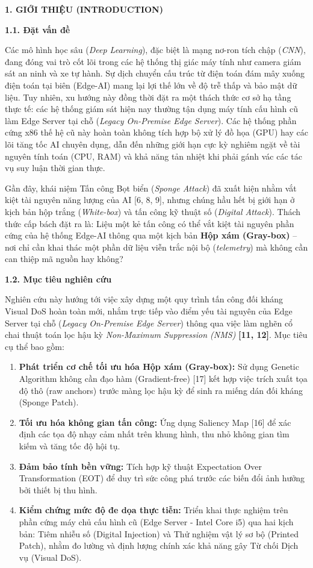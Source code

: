 \textbf{1. GIỚI THIỆU (INTRODUCTION)}

\textbf{1.1. Đặt vấn đề}

Các mô hình học sâu (\emph{Deep Learning}), đặc biệt là mạng nơ-ron tích
chập (\emph{CNN}), đang đóng vai trò cốt lõi trong các hệ thống thị giác
máy tính như camera giám sát an ninh và xe tự hành. Sự dịch chuyển cấu
trúc từ điện toán đám mây xuống điện toán tại biên (Edge-AI) mang lại
lợi thế lớn về độ trễ thấp và bảo mật dữ liệu. Tuy nhiên, xu hướng này
đồng thời đặt ra một thách thức cơ sở hạ tầng thực tế: các hệ thống giám
sát hiện nay thường tận dụng máy tính cấu hình cũ làm Edge Server tại
chỗ (\emph{Legacy On-Premise Edge Server}). Các hệ thống phần cứng x86
thế hệ cũ này hoàn toàn không tích hợp bộ xử lý đồ họa (GPU) hay các lõi
tăng tốc AI chuyên dụng, dẫn đến những giới hạn cực kỳ nghiêm ngặt về
tài nguyên tính toán (CPU, RAM) và khả năng tản nhiệt khi phải gánh vác
các tác vụ suy luận thời gian thực.

Gần đây, khái niệm Tấn công Bọt biển (\emph{Sponge Attack}) đã xuất hiện
nhằm vắt kiệt tài nguyên năng lượng của AI {[}6, 8, 9{]}, nhưng chúng
hầu hết bị giới hạn ở kịch bản hộp trắng (\emph{White-box}) và tấn công
kỹ thuật số (\emph{Digital Attack}). Thách thức cấp bách đặt ra là: Liệu
một kẻ tấn công có thể vắt kiệt tài nguyên phần cứng của hệ thống
Edge-AI thông qua một kịch bản \textbf{Hộp xám (Gray-box)} -- nơi chỉ
cần khai thác một phần dữ liệu viễn trắc nội bộ (\emph{telemetry}) mà
không cần can thiệp mã nguồn hay không?

\textbf{1.2. Mục tiêu nghiên cứu}

Nghiên cứu này hướng tới việc xây dựng một quy trình tấn công đối kháng
Visual DoS hoàn toàn mới, nhắm trực tiếp vào điểm yếu tài nguyên của
Edge Server tại chỗ (\emph{Legacy On-Premise Edge Server}) thông qua
việc làm nghẽn cổ chai thuật toán lọc hậu kỳ \emph{Non-Maximum
Suppression (NMS)} \textbf{{[}11, 12{]}}. Mục tiêu cụ thể bao gồm:

\begin{enumerate}
\def\labelenumi{\arabic{enumi}.}
\item
  \textbf{Phát triển cơ chế tối ưu hóa Hộp xám (Gray-box):} Sử dụng
  Genetic Algorithm không cần đạo hàm (Gradient-free) {[}17{]} kết hợp
  việc trích xuất tọa độ thô (raw anchors) trước màng lọc hậu kỳ để sinh
  ra miếng dán đối kháng (Sponge Patch).
\item
  \textbf{Tối ưu hóa không gian tấn công:} Ứng dụng Saliency Map
  {[}16{]} để xác định các tọa độ nhạy cảm nhất trên khung hình, thu nhỏ
  không gian tìm kiếm và tăng tốc độ hội tụ.
\item
  \textbf{Đảm bảo tính bền vững:} Tích hợp kỹ thuật Expectation Over
  Transformation (EOT) để duy trì sức công phá trước các biến đổi ảnh
  hưởng bởi thiết bị thu hình.
\item
  \textbf{Kiểm chứng mức độ đe dọa thực tiễn:} Triển khai thực nghiệm
  trên phần cứng máy chủ cấu hình cũ (Edge Server - Intel Core i5) qua
  hai kịch bản: Tiêm nhiễu số (Digital Injection) và Thử nghiệm vật lý
  sơ bộ (Printed Patch), nhằm đo lường và định lượng chính xác khả năng
  gây Từ chối Dịch vụ (Visual DoS).
\end{enumerate}

